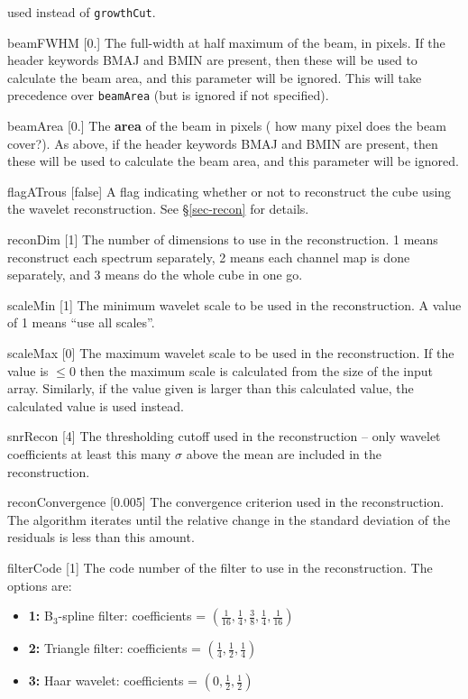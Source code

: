 \begin{Lentry}
  used instead of \texttt{growthCut}.
\item[{beamFWHM [0.]}] The full-width at half maximum of the beam, in
  pixels.  If the header keywords BMAJ and BMIN are present, then
  these will be used to calculate the beam area, and this parameter
  will be ignored. This will take precedence over \texttt{beamArea}
  (but is ignored if not specified).
\item[{beamArea [0.]}] The \textbf{area} of the beam in pixels (\ie
  how many pixel does the beam cover?). As above, if the header
  keywords BMAJ and BMIN are present, then these will be used to
  calculate the beam area, and this parameter will be ignored. 
\end{Lentry}

\begin{Lentry}
\item[{flagATrous [false]}] A flag indicating whether or not to
  reconstruct the cube using the \atrous wavelet
  reconstruction. See \S\ref{sec-recon} for details.
\item[{reconDim [1]}] The number of dimensions to use in the
  reconstruction. 1 means reconstruct each spectrum separately, 2
  means each channel map is done separately, and 3 means do the whole
  cube in one go.
\item[{scaleMin [1]}] The minimum wavelet scale to be used in the
  reconstruction. A value of 1 means ``use all scales''.
\item[{scaleMax [0]}] The maximum wavelet scale to be used in the
  reconstruction. If the value is $\le0$ then the maximum scale is
  calculated from the size of the input array. Similarly, if the value
  given is larger than this calculated value, the calculated value is
  used instead.
\item[{snrRecon [4]}] The thresholding cutoff used in the
  reconstruction -- only wavelet coefficients at least this many $\sigma$ above
  the mean are included in the reconstruction. 
\item[{reconConvergence [0.005]}] The convergence criterion used in
  the reconstruction. The \atrous algorithm iterates until the
  relative change in the standard deviation of the residuals is less
  than this amount.
\item[{filterCode [1]}] The code number of the filter to use in
  the reconstruction. The options are:
  \begin{itemize}
  \item \textbf{1:} B$_3$-spline filter: coefficients = 
    $(\frac{1}{16}, \frac{1}{4}, \frac{3}{8}, \frac{1}{4}, \frac{1}{16})$
  \item \textbf{2:} Triangle filter: coefficients = 
    $(\frac{1}{4}, \frac{1}{2}, \frac{1}{4})$
  \item \textbf{3:} Haar wavelet: coefficients = 
    $(0, \frac{1}{2}, \frac{1}{2})$
  \end{itemize}
\end{Lentry}

